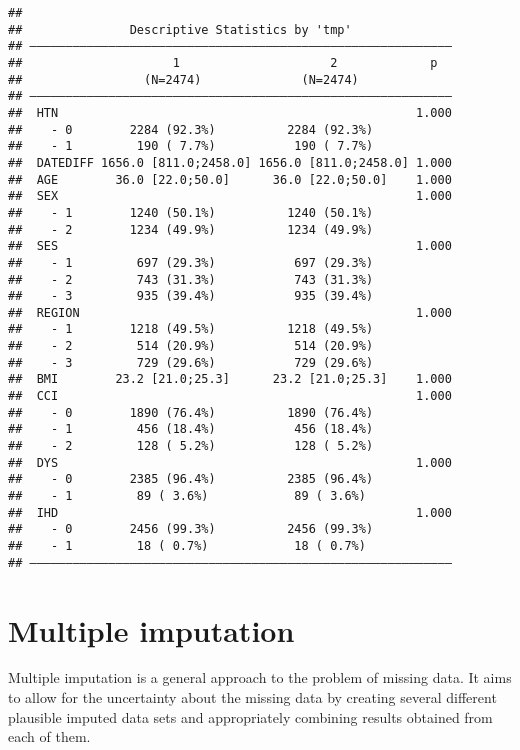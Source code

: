 \documentclass[
]{book}
\theoremstyle{definition}
\theoremstyle{definition}
\theoremstyle{definition}
\theoremstyle{definition}
\theoremstyle{remark}
\begin{document}
\begin{verbatim}
## 
##               Descriptive Statistics by 'tmp'             
## ——————————————————————————————————————————————————————————— 
##                     1                     2             p  
##                 (N=2474)              (N=2474)       
## ——————————————————————————————————————————————————————————— 
##  HTN                                                  1.000
##    - 0        2284 (92.3%)          2284 (92.3%)           
##    - 1         190 ( 7.7%)           190 ( 7.7%)           
##  DATEDIFF 1656.0 [811.0;2458.0] 1656.0 [811.0;2458.0] 1.000
##  AGE        36.0 [22.0;50.0]      36.0 [22.0;50.0]    1.000
##  SEX                                                  1.000
##    - 1        1240 (50.1%)          1240 (50.1%)           
##    - 2        1234 (49.9%)          1234 (49.9%)           
##  SES                                                  1.000
##    - 1         697 (29.3%)           697 (29.3%)           
##    - 2         743 (31.3%)           743 (31.3%)           
##    - 3         935 (39.4%)           935 (39.4%)           
##  REGION                                               1.000
##    - 1        1218 (49.5%)          1218 (49.5%)           
##    - 2         514 (20.9%)           514 (20.9%)           
##    - 3         729 (29.6%)           729 (29.6%)           
##  BMI        23.2 [21.0;25.3]      23.2 [21.0;25.3]    1.000
##  CCI                                                  1.000
##    - 0        1890 (76.4%)          1890 (76.4%)           
##    - 1         456 (18.4%)           456 (18.4%)           
##    - 2         128 ( 5.2%)           128 ( 5.2%)           
##  DYS                                                  1.000
##    - 0        2385 (96.4%)          2385 (96.4%)           
##    - 1         89 ( 3.6%)            89 ( 3.6%)            
##  IHD                                                  1.000
##    - 0        2456 (99.3%)          2456 (99.3%)           
##    - 1         18 ( 0.7%)            18 ( 0.7%)            
## ———————————————————————————————————————————————————————————
\end{verbatim}

\hypertarget{multiple-imputation}{%
\chapter{Multiple imputation}\label{multiple-imputation}}

Multiple imputation is a general approach to the problem of missing data. It aims to allow for the uncertainty about the missing data by creating several different plausible imputed data sets and appropriately combining results obtained from each of them.
\end{document}
